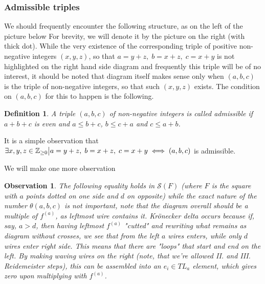 \documentclass[10pt]{article} %
\newtheorem{definition}{Definition}[section]
\newtheorem{observation}{Observation}
\theoremstyle{remark}
\renewcommand{\S}{\mathcal{S}}
\newcommand{\f}[1]{f^{(#1)}}
\begin{document}
\subsubsection{Admissible triples}
We should frequently encounter the following structure, as on the left of the picture below
For brevity, we will denote it by the picture on the right (with thick dot). While the very existence of the corresponding triple of 
positive non-negative integers $(x,y,z)$, so that $a=y+z,\;b=x+z,\;c=x+y$ is not highlighted on the right hand side diagram and frequently this
triple will be of no interest, it should be noted that diagram itself makes sense only when $(a,b,c)$ is the triple of non-negative integers,
so that such $(x,y,z)$ exists. The condition on $(a,b,c)$ for this to happen is the following.
\begin{definition}A triple $(a,b,c)$ of non-negative integers is called admissible if $a+b+c$ is even and $a\leq b+c$, $b\leq c+a$ 
and $c\leq a+b$.\end{definition}
It is a simple observation that $\exists x,y,z\in\mathbb{Z}_{\geq0}\big|a=y+z,\;b=x+z,\;c=x+y\iff (a,b,c)$ is admissible.

We will make one more observation
\begin{observation}\normalfont\label{Observation}
The following equality holds in $\S(F)$ (where $F$ is the square with $a$ points dotted on one side and $d$ on opposite)
while the exact nature of the number $\theta(a,b,c)$ is not important, note that the diagram overall should be a multiple of $\f{a}$, as
leftmost wire contains it. Kr\"onecker delta occurs because if, say, $a>d$, then having leftmost $\f{a}$ "cutted" and rewriting what remains
as diagram without crosses, we see that from the left
$a$ wires enters, while only $d$ wires enter right side. This means that there are "loops" that start and end on the left. By making waving wires
on the right (note, that we're allowed II. and III. Reidemeister steps), this can be assembled into an $e_i\in TL_a$ element, which gives zero
upon multiplying with $\f{a}$.
\end{observation}
\end{document}

